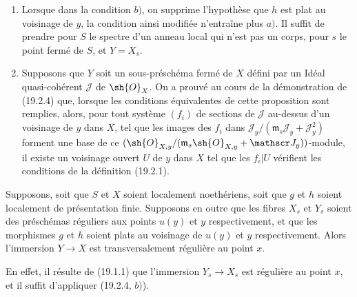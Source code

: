 \begin{remarks}[19.2.5]
\label{IV.19.2.5}
\begin{enumerate}
  \item[(i)] Lorsque dans la condition $b)$, on supprime l'hypothèse que $h$ est plat au voisinage de $y$, la condition ainsi modifiée n'entraîne plus $a)$. Il suffit de prendre pour $S$ le spectre d'un anneau local qui n'est pas un corps, pour $s$ le point fermé de $S$, et $Y=X_s$.
  \item[(ii)] Supposons que $Y$ soit un sous-préschéma fermé de $X$ défini par un Idéal quasi-cohérent $\mathscr J$ de $\sh{O}_X$. On a prouvé au cours de la démonstration de (19.2.4) que, lorsque les conditions équivalentes de cette proposition sont remplies, alors, pour tout système $(f_i)$ de sections de $\mathscr J$ au-dessus d'un voisinage de $y$ dans $X$, tel que les images des $f_i$ dans $\mathscr J_y/(\mathfrak m_s\mathscr J_y+\mathscr J_y^2)$ forment une base de ce $(\sh{O}_{X,y}/(\mathfrak m_s\sh{O}_{X,y}+\mathscr J_y))$-module, il existe un voisinage ouvert $U$ de $y$ dans $X$ tel que les $f_i|U$ vérifient les conditions de la définition (19.2.1).
\end{enumerate}
\end{remarks}


\begin{corollary}[19.2.6]
\label{IV.19.2.6}
Supposons, soit que $S$ et $X$ soient localement noethériens, soit que $g$ et $h$ soient localement de présentation finie. Supposons en outre que les fibres $X_s$ et $Y_s$ soient des préschémas réguliers aux points $u(y)$ et $y$ respectivement, et que les morphismes $g$ et $h$ soient plats au voisinage de $u(y)$ et $y$ respectivement. Alors l'immersion $Y\to X$ est transversalement régulière au point $x$.
\end{corollary}

En effet, il résulte de (19.1.1) que l'immersion $Y_s\to X_s$ est régulière au point $x$, et il suffit d'appliquer (19.2.4, $b)$).

